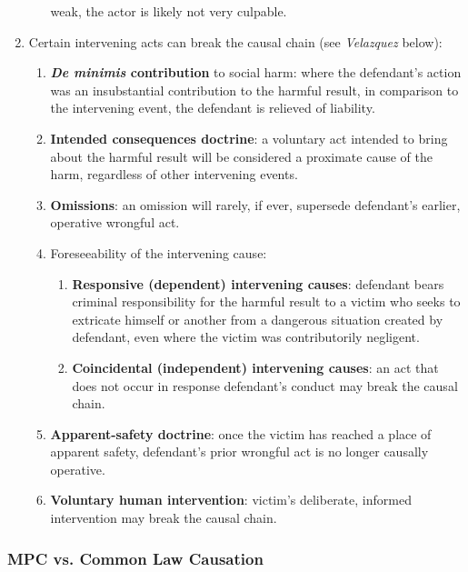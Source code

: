 \begin{enumerate}
\begin{enumerate}
        weak, the actor is likely not very culpable.
    \end{enumerate}
    \item Certain intervening acts can break the causal chain (see 
    \emph{Velazquez} below):
    \begin{enumerate}
        \item \textbf{\emph{De minimis} contribution} to social harm: where 
        the defendant's action was an insubstantial contribution to the 
        harmful result, in comparison to the intervening event, the defendant 
        is relieved of liability.
        \item \textbf{Intended consequences doctrine}: a voluntary act intended to 
        bring about the harmful result will be considered a proximate cause of 
        the harm, regardless of other intervening events.
        \item \textbf{Omissions}: an omission will rarely, if ever, supersede 
        defendant's earlier, operative wrongful act.
        \item Foreseeability of the intervening cause:
        \begin{enumerate}
            \item \textbf{Responsive (dependent) intervening causes}: 
            defendant bears criminal responsibility for the harmful result to 
            a victim who seeks to extricate himself or another from a 
            dangerous situation created by defendant, even where the victim 
            was contributorily negligent.
            \item \textbf{Coincidental (independent) intervening causes}: an 
            act that does not occur in response defendant's conduct may break 
            the causal chain.
        \end{enumerate}
        \item \textbf{Apparent-safety doctrine}: once the victim has reached a 
        place of apparent safety, defendant's prior wrongful act is no longer 
        causally operative.
        \item \textbf{Voluntary human intervention}: victim's deliberate, 
        informed intervention may break the causal chain.
    \end{enumerate}
\end{enumerate}

\subsubsection{MPC vs. Common Law Causation}

